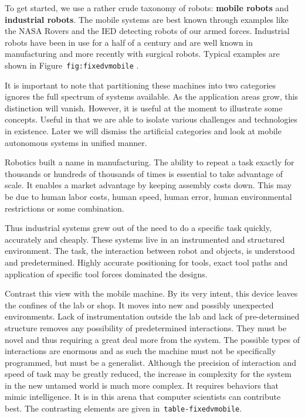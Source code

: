 To get started, we use a rather crude taxonomy of robots: \textbf{mobile
robots} and \textbf{industrial robots}. The mobile systems are best
known through examples like the NASA Rovers and the IED detecting robots
of our armed forces. Industrial robots have been in use for a half of a
century and are well known in manufacturing and more recently with
surgical robots. Typical examples are shown in
Figure~\texttt{fig:fixedvmobile} .

It is important to note that partitioning these machines into two
categories ignores the full spectrum of systems available. As the
application areas grow, this distinction will vanish. However, it is
useful at the moment to illustrate some concepts. Useful in that we are
able to isolate various challenges and technologies in existence. Later
we will dismiss the artificial categories and look at mobile autonomous
systems in unified manner.

Robotics built a name in manufacturing. The ability to repeat a task
exactly for thousands or hundreds of thousands of times is essential to
take advantage of scale. It enables a market advantage by keeping
assembly costs down. This may be due to human labor costs, human speed,
human error, human environmental restrictions or some combination.

Thus industrial systems grew out of the need to do a specific task
quickly, accurately and cheaply. These systems live in an instrumented
and structured environment. The task, the interaction between robot and
objects, is understood and predetermined. Highly accurate positioning
for tools, exact tool paths and application of specific tool forces
dominated the designs.

Contrast this view with the mobile machine. By its very intent, this
device leaves the confines of the lab or shop. It moves into new and
possibly unexpected environments. Lack of instrumentation outside the
lab and lack of pre-determined structure removes any possibility of
predetermined interactions. They must be novel and thus requiring a
great deal more from the system. The possible types of interactions are
enormous and as such the machine must not be specifically programmed,
but must be a generalist. Although the precision of interaction and
speed of task may be greatly reduced, the increase in complexity for the
system in the new untamed world is much more complex. It requires
behaviors that mimic intelligence. It is in this arena that computer
scientists can contribute best. The contrasting elements are given
in~\texttt{table-fixedvmobile}.

